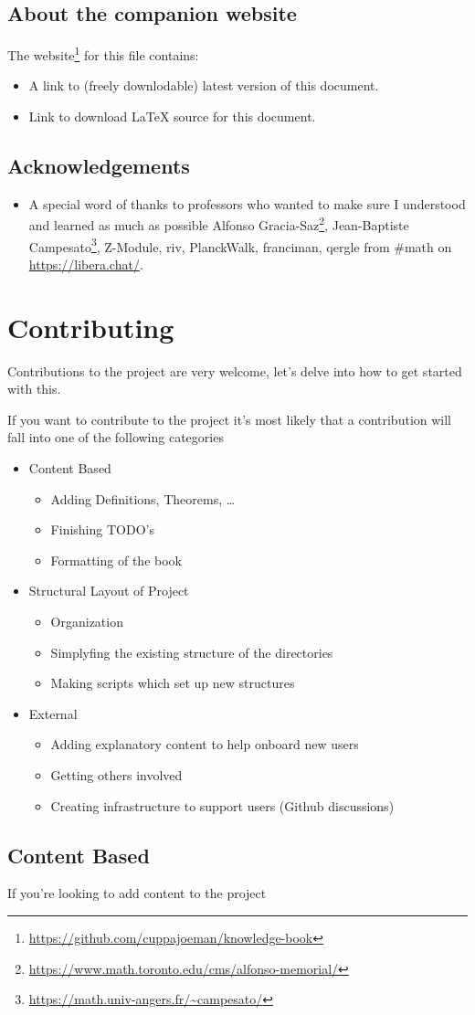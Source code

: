 \section*{About the companion website}
The website\footnote{\url{https://github.com/cuppajoeman/knowledge-book}} for this file contains:
\begin{itemize}
  \item A link to (freely downlodable) latest version of this document.
  \item Link to download LaTeX source for this document.
\end{itemize}

\section*{Acknowledgements}
\begin{itemize}
    \item A special word of thanks to professors who wanted to make sure I understood and learned as much as possible Alfonso Gracia-Saz\footnote{\url{https://www.math.toronto.edu/cms/alfonso-memorial/}}, Jean-Baptiste Campesato\footnote{\url{https://math.univ-angers.fr/~campesato/}}, Z-Module, riv, PlanckWalk, franciman, qergle from \#math on \url{https://libera.chat/}.
\end{itemize}

\chapter*{Contributing}
 
Contributions to the project are very welcome, let's delve into how to get started with this.

If you want to contribute to the project it's most likely that a contribution will fall into one of the following categories
\begin{itemize}
  \item Content Based 
  \begin{itemize}
      \item Adding Definitions, Theorems, \ldots
      \item Finishing TODO's
      \item Formatting of the book
  \end{itemize}
  \item Structural Layout of Project 
  \begin{itemize}
      \item Organization
      \item Simplyfing the existing structure of the directories 
      \item Making scripts which set up new structures
  \end{itemize}
  \item External
  \begin{itemize}
      \item Adding explanatory content to help onboard new users
      \item Getting others involved
      \item Creating infrastructure to support users (Github discussions)
  \end{itemize}
\end{itemize}

\section*{Content Based}

If you're looking to add content to the project 
